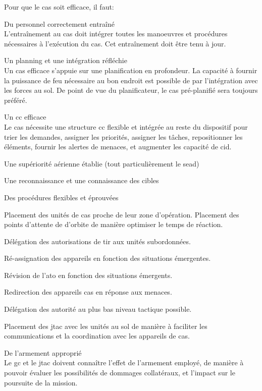\e
	\item 
	Pour que le \gls{cas} soit efficace, il faut:
	\ee
		\item Du personnel correctement entraîné \\
		L'entraînement au \gls{cas} doit intégrer toutes les manoeuvres et procédures nécessaires à l'exécution du \gls{cas}. Cet entraînement doit être tenu à jour.
		\item Un planning et une intégration réfléchie \\
		Un \gls{cas} efficace s'appuie sur une planification en profondeur. La capacité à fournir la puissance de feu nécessaire au bon endroit est possible de par l'intégration avec les forces au sol. De point de vue du planificateur, le \gls{cas} pré-planifié sera toujours préféré.
		\item Un \gls{cc} efficace \\
		Le \gls{cas} nécessite une structure \gls{cc} flexible et intégrée au reste du dispositif pour trier les demandes, assigner les priorités, assigner les tâches, repositionner les éléments, fournir les alertes de menaces, et augmenter les capacité de \gls{cid}.
		\item Une supériorité aérienne établie (tout particulièrement le \gls{sead})
		\item Une reconnaissance et une connaissance des cibles
		\item Des procédures flexibles et éprouvées
		\eee
			\item Placement des unités de \gls{cas} proche de leur zone d'opération. Placement des points d'attente de d'orbite de manière optimiser le temps de réaction.
			\item Délégation des autorisations de tir aux unités subordonnées.
			\item Ré-assignation des appareils en fonction des situations émergentes.
			\item Révision de l'\gls{ato} en fonction des situations émergents.
			\item Redirection des appareils \gls{cas} en réponse aux menaces.
			\item Délégation des autorité au plus bas niveau tactique possible.
			\item Placement des \gls{jtac} avec les unités au sol de manière à faciliter les communications et la coordination avec les appareils de \gls{cas}.			
		\ed
		\item De l'armement approprié \\
		Le \gls{gc} et le \gls{jtac} doivent connaître l'effet de l'armement employé, de manière à pouvoir évaluer les possibilités de dommages collatéraux, et l'impact sur le poursuite de la mission.
